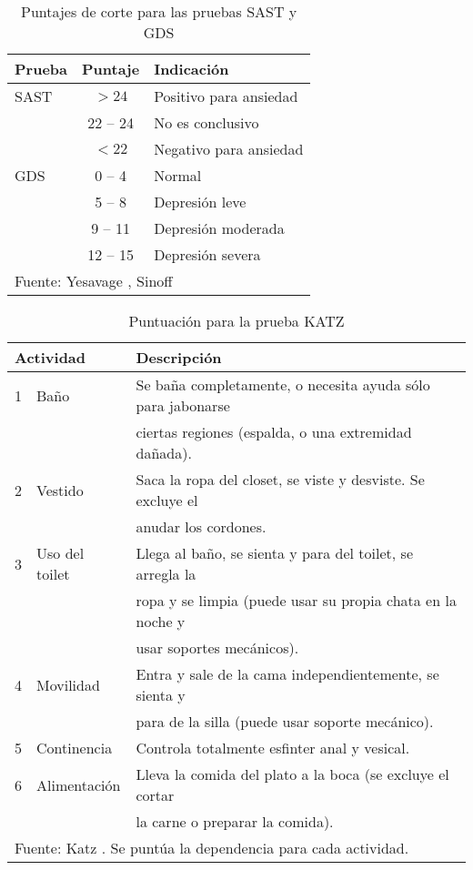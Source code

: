 \begin{table}
\centering
\caption{Puntajes de corte para las pruebas SAST y GDS}
\begin{tabular}{lcl}
\toprule
Prueba & Puntaje & Indicación \\
\midrule
SAST
& $>24$ & Positivo para ansiedad \\
& 22 -- 24 & No es conclusivo \\
& $<22$ & Negativo para ansiedad \\
\midrule
GDS
& 0 -- 4 & Normal \\
& 5 -- 8 & Depresión leve \\
& 9 -- 11 & Depresión moderada \\
& 12 -- 15 & Depresión severa \\
\bottomrule
\multicolumn{3}{l}{Fuente: Yesavage \cite{Yesavage82}, Sinoff \cite{sinoff99} }
\end{tabular}
\label{anexo:sast_gds}
\end{table}

\begin{table}
\centering
\caption{Puntuación para la prueba KATZ}
\begin{tabular}{lll}
\toprule
\multicolumn{2}{l}{Actividad} & Descripción \\
\midrule
1 & Baño           & Se baña completamente, o necesita ayuda sólo para jabonarse\\
                  && ciertas regiones (espalda, o una extremidad dañada). \\
2 & Vestido & Saca la ropa del closet, se viste y desviste. Se excluye el\\
                  && anudar los cordones. \\
3 & Uso del toilet & Llega al baño, se sienta y para del toilet, se arregla la\\
                  && ropa y se limpia (puede usar su propia chata en la noche y\\
                  && usar soportes mecánicos).\\
4 & Movilidad      & Entra y sale de la cama independientemente, se sienta y\\
                  && para de la silla (puede usar soporte mecánico). \\
5 & Continencia    & Controla totalmente esfinter anal y vesical.\\
6 & Alimentación   & Lleva la comida del plato a la boca (se excluye el cortar\\
                  && la carne o preparar la comida). \\
\bottomrule
\multicolumn{3}{l}{Fuente: Katz \cite{katz70}. Se puntúa la dependencia para cada actividad.}
\end{tabular}
\label{anexo:katz}
\end{table}

